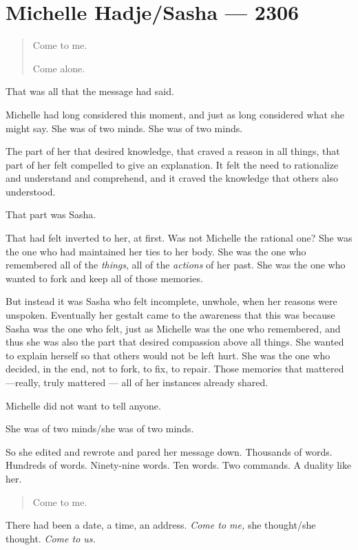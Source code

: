 \hypertarget{michelle-hadjesasha-2306}{%
\chapter{Michelle Hadje/Sasha — 2306}\label{michelle-hadjesasha-2306}}

\begin{quote}
Come to me.

Come alone.
\end{quote}

That was all that the message had said.

Michelle had long considered this moment, and just as long considered what she might say. She was of two minds. She was of two minds.

The part of her that desired knowledge, that craved a reason in all things, that part of her felt compelled to give an explanation. It felt the need to rationalize and understand and comprehend, and it craved the knowledge that others also understood.

That part was Sasha.

That had felt inverted to her, at first. Was not Michelle the rational one? She was the one who had maintained her ties to her body. She was the one who remembered all of the \emph{things}, all of the \emph{actions} of her past. She was the one who wanted to fork and keep all of those memories.

But instead it was Sasha who felt incomplete, unwhole, when her reasons were unspoken. Eventually her gestalt came to the awareness that this was because Sasha was the one who felt, just as Michelle was the one who remembered, and thus she was also the part that desired compassion above all things. She wanted to explain herself so that others would not be left hurt. She was the one who decided, in the end, not to fork, to fix, to repair. Those memories that mattered---really, truly mattered — all of her instances already shared.

Michelle did not want to tell anyone.

She was of two minds/she was of two minds.

So she edited and rewrote and pared her message down. Thousands of words. Hundreds of words. Ninety-nine words. Ten words. Two commands. A duality like her.

\begin{quote}
Come to me.
\end{quote}

There had been a date, a time, an address. \emph{Come to me,} she thought/she thought. \emph{Come to us.}


